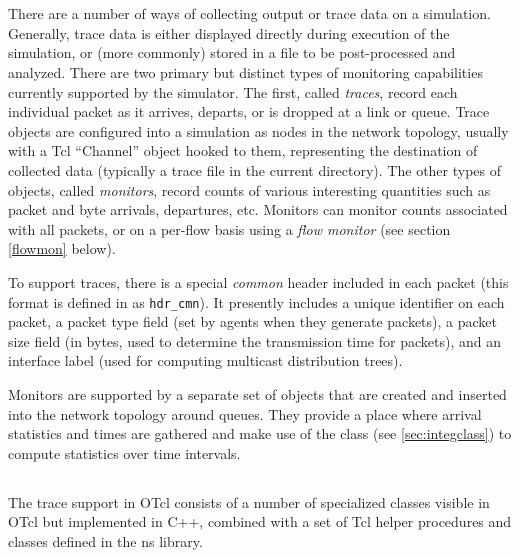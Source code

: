 %
%
\section{}

There are a number of ways of collecting output or
trace data on a simulation.
Generally, trace data is either displayed directly during execution
of the simulation, or (more commonly) stored in a file to be
post-processed and analyzed.
There are two primary but distinct types of monitoring capabilities
currently supported by the simulator.
The first, called {\em traces}, record each individual packet
as it arrives, departs, or is dropped at a link or queue.
Trace objects are configured into a simulation as nodes in the
network topology, usually with a Tcl ``Channel'' object
hooked to them, representing the destination of collected data
(typically a trace file in the current directory).
The other types of objects, called {\em monitors}, record counts
of various interesting quantities such as packet and byte arrivals,
departures, etc.
Monitors can monitor counts associated with all packets,
or on a per-flow basis using a {\em flow monitor}
(see section \ref{flowmon} below).

To support traces, there is a special {\em common} header
included in each packet (this format is defined in 
as {\tt hdr\_cmn}).
It presently includes a unique identifier on each packet, a
packet type field (set by agents when they generate packets),
a packet size field (in bytes, used to determine the transmission
time for packets), and an interface label (used for computing
multicast distribution trees).

Monitors are supported by a separate
set of objects that are created and inserted into the network topology
around queues.
They provide a place where
arrival statistics and times are gathered and make
use of the  class (see \ref{sec:integclass}) to
compute statistics over time intervals.

\subsection{}

The trace support in OTcl consists of a number of specialized
classes visible in OTcl but implemented in C++, combined
with a set of Tcl helper procedures and classes defined in the ns library.

